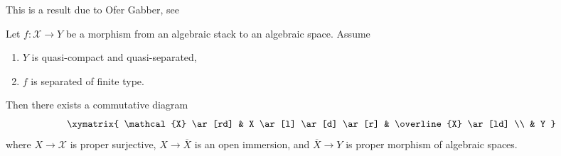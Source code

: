 %

\begin{theorem}
\label{theorem-chow-finite-type}
\begin{reference}
This is a result due to Ofer Gabber, see
\cite[Theorem 1.1]{olsson_proper}
\end{reference}
Let $f : \mathcal{X} \to Y$ be a morphism from an algebraic stack
to an algebraic space. Assume
\begin{enumerate}
\item $Y$ is quasi-compact and quasi-separated,
\item $f$ is separated of finite type.
\end{enumerate}
Then there exists a commutative diagram
$$
\xymatrix{
\mathcal{X} \ar[rd] & X \ar[l] \ar[d] \ar[r] & \overline{X} \ar[ld] \\
& Y
}
$$
where $X \to \mathcal{X}$ is proper surjective,
$X \to \overline{X}$ is an open immersion, and
$\overline{X} \to Y$ is proper morphism of algebraic spaces.
\end{theorem}

